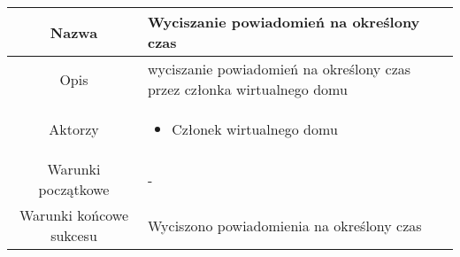 \documentclass{article}
\begin{document}
\begin{enumerate}
		\begin{table}[H]
			\centering
			\begin{tabular}{|c|p{7cm}|}
				\hline
				Nazwa                   & Wyciszanie powiadomień na określony czas                                                                                                                                                                                                                                                                                                                                                                                                                                 \\
				\hline
				Opis                    & wyciszanie powiadomień na określony czas przez członka wirtualnego domu                                                                                                                                                                                                                                                                                                                                                                                                  \\
				\hline
				Aktorzy                 & \begin{itemize}\item Członek wirtualnego domu\end{itemize}                                                                                                                                                                                                                                                                                                                                                                                                               \\
				\hline
				Warunki początkowe      & -                                                                                                                                                                                                                                                                                                                                                                                                                                                                        \\
				\hline
				Warunki końcowe sukcesu & Wyciszono powiadomienia na określony czas                                                                                                                                                                                                                                                                                                                                                                                                                                \\

\end{tabular}
\end{table}
\end{enumerate}
\end{document}
